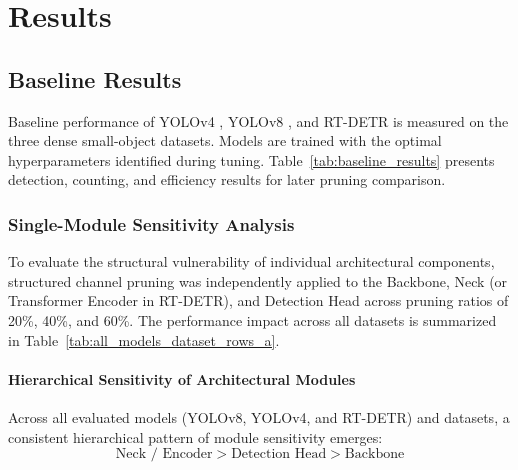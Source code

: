 \chapter{Results}
\label{sec:results}

\section{Baseline Results}
Baseline performance of YOLOv4 \cite{Bochkovskiy2020YOLOv4}, YOLOv8 \cite{yolov8}, and RT-DETR \cite{Zhao2023RTDETR} is measured on the three dense small-object datasets. Models are trained with the optimal hyperparameters identified during tuning. Table~\ref{tab:baseline_results} presents detection, counting, and efficiency results for later pruning comparison.

\begin{table}[t]
\centering
\caption{\textbf{Baseline detection, counting, and efficiency performance of YOLOv8, YOLOv4, and RT-DETR across the Aedes aegypti Egg, CoNSeP, and Sorghum-Grain-Count (SGC) datasets.}}
\label{tab:baseline_results}
\resizebox{\linewidth}{!}{
  
}
\end{table}

\begin{table}[p] 
\centering 
\caption[Single-Module $\Delta\mathrm{mAP}_{50}$ Performance Loss]{Single-Module $\Delta\mathrm{mAP}_{50}$ (\%) Performance Loss Across All Models, Pruning Ratios, and Datasets.}
\scriptsize %
\renewcommand{\arraystretch}{0.75} %
\setlength{\tabcolsep}{4pt} %


\end{table}

\subsection{Single-Module Sensitivity Analysis}

To evaluate the structural vulnerability of individual architectural components, structured channel pruning was independently applied to the Backbone, Neck (or Transformer Encoder in RT-DETR), and Detection Head across pruning ratios of 20\%, 40\%, and 60\%. The performance impact across all datasets is summarized in Table~\ref{tab:all_models_dataset_rows_a}. 

\subsubsection{Hierarchical Sensitivity of Architectural Modules}
Across all evaluated models (YOLOv8, YOLOv4, and RT-DETR) and datasets, a consistent hierarchical pattern of module sensitivity emerges: 
\begin{equation}
\text{Neck / Encoder} > \text{Detection Head} > \text{Backbone}
\end{equation}

